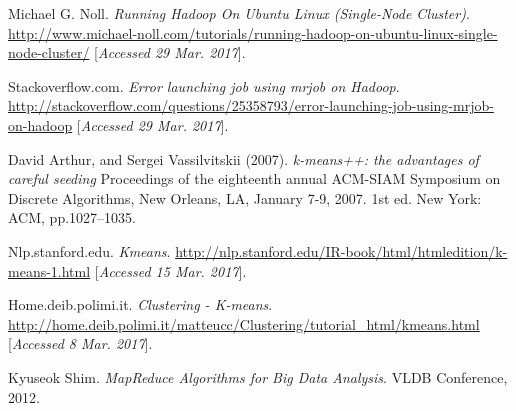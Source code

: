 \documentclass[11pt]{article}
\begin{document}
\begin{thebibliography}{9}
	Michael G. Noll.
	\textit{Running Hadoop On Ubuntu Linux (Single-Node Cluster)}. 
	\url {http://www.michael-noll.com/tutorials/running-hadoop-on-ubuntu-linux-single-node-cluster/}
	[\textit{Accessed 29 Mar. 2017}]. 
							
	Stackoverflow.com.
	\textit{Error launching job using mrjob on Hadoop}. 
	\url {http://stackoverflow.com/questions/25358793/error-launching-job-using-mrjob-on-hadoop}
	[\textit{Accessed 29 Mar. 2017}].
							
	David Arthur, and Sergei Vassilvitskii (2007). 
	\textit{k-means++: the advantages of careful seeding }
	Proceedings of the eighteenth annual ACM-SIAM Symposium on Discrete Algorithms, New Orleans, LA, January 7-9, 2007. 1st ed. New York: ACM, pp.1027–1035.
							
	Nlp.stanford.edu.
	\textit{Kmeans}. 
	\url {http://nlp.stanford.edu/IR-book/html/htmledition/k-means-1.html}
	[\textit{Accessed 15 Mar. 2017}].
							
	Home.deib.polimi.it.
	\textit{Clustering - K-means}. 
	\url {http://home.deib.polimi.it/matteucc/Clustering/tutorial\_html/kmeans.html}
	[\textit{Accessed 8 Mar. 2017}].
							
	Kyuseok Shim.
	\textit{MapReduce Algorithms for Big Data Analysis}. 
	VLDB Conference, 2012.
							
\end{thebibliography}
\end{document}
